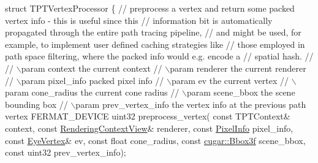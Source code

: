 \begin{DoxyParagraph}{}
\begin{DoxyEnumerate}
\begin{DoxyCode}
\textcolor{keyword}{struct }TPTVertexProcessor
\{
  \textcolor{comment}{// preprocess a vertex and return some packed vertex info - this is useful since this}
  \textcolor{comment}{// information bit is automatically propagated through the entire path tracing pipeline,}
  \textcolor{comment}{// and might be used, for example, to implement user defined caching strategies like}
  \textcolor{comment}{// those employed in path space filtering, where the packed info would e.g. encode a}
  \textcolor{comment}{// spatial hash.}
  \textcolor{comment}{//}
  \textcolor{comment}{// \(\backslash\)param context               the current context}
  \textcolor{comment}{// \(\backslash\)param renderer              the current renderer}
  \textcolor{comment}{// \(\backslash\)param pixel\_info            packed pixel info}
  \textcolor{comment}{// \(\backslash\)param ev                    the current vertex}
  \textcolor{comment}{// \(\backslash\)param cone\_radius           the current cone radius}
  \textcolor{comment}{// \(\backslash\)param scene\_bbox            the scene bounding box}
  \textcolor{comment}{// \(\backslash\)param prev\_vertex\_info      the vertex info at the previous path vertex}
  FERMAT\_DEVICE
  uint32 preprocess\_vertex(
      \textcolor{keyword}{const} TPTContext&           context,
      \textcolor{keyword}{const} \hyperlink{struct_rendering_context_view}{RenderingContextView}& renderer,
      \textcolor{keyword}{const} \hyperlink{union_pixel_info}{PixelInfo}             pixel\_info,
      \textcolor{keyword}{const} \hyperlink{struct_eye_vertex}{EyeVertex}&            ev,
      \textcolor{keyword}{const} \textcolor{keywordtype}{float}                 cone\_radius,
      \textcolor{keyword}{const} \hyperlink{structcugar_1_1_bbox}{cugar::Bbox3f}         scene\_bbox,
      \textcolor{keyword}{const} uint32                prev\_vertex\_info);


\end{DoxyCode}
\end{DoxyEnumerate}
\end{DoxyParagraph}
